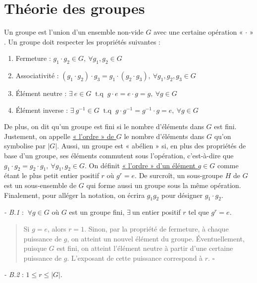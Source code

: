 \section{Théorie des groupes}
Un groupe est l'union d'un ensemble non-vide $G$ avec une certaine opération « $\cdot$ » \cite{key} \cite{nielsen00}. Un groupe doit respecter les propriétés suivantes : 

\begin{enumerate}
    \item Fermeture : $g_1 \cdot g_2 \in G, \ \forall g_1,g_2 \in G$ 
    \item Associativité : $(g_1 \cdot g_2) \cdot g_3 = g_1 \cdot (g_2 \cdot g_3), \ \forall g_1,g_2,g_3 \in G$
    \item Élément neutre : $\exists \ e \in G \ \text{  t.q  } \ g \cdot e = e \cdot g = g, \ \forall g \in G$
    \item Élément inverse : $\exists \ g^{-1} \in G \ \text{ t.q } \ g \cdot g^{-1} = g^{-1} \cdot g = e, \ \forall g \in G$
\end{enumerate}

De plus, on dit qu'un groupe est fini si le nombre d'éléments dans $G$ est fini. Justement, on appelle \underline{« l'ordre » de $G$} le nombre d'éléments dans $G$ qu'on symbolise par $|G|$. Aussi, un groupe est « abélien » si, en plus des propriétés de base d'un groupe, ses éléments commutent sous l'opération, c'est-à-dire que $g_1 \cdot g_2 = g_2 \cdot g_1, \ \forall g_1,g_2 \in G$. On définit \underline{« l'ordre »  d'un élément $g \in G$} comme étant le plus petit entier positif $r$ où $g^r = e$. De surcroît, un sous-groupe $H$ de $G$ est un sous-ensemble de $G$ qui forme aussi un groupe sous la même opération. Finalement, pour alléger la notation, on écrira $g_1 g_2$ pour désigner $g_1 \cdot g_2$. 

\textit{- B.1} : $\ \forall g \in G$ où $G$ est un groupe fini, $\exists \ $un entier positif $r$ tel que $g^r = e$.

\begin{quote}
    Si $g = e$, alors $r = 1$. Sinon, par la propriété de fermeture, à chaque puissance de $g$, on atteint un nouvel élément du groupe. Éventuellement, puisque $G$ est fini, on atteint l'élément neutre à partir d'une certaine puissance de $g$. L'exposant de cette puissance correspond à $r$. $\square$
\end{quote}

\textit{- B.2} : $1 \leq r \leq |G|$.

